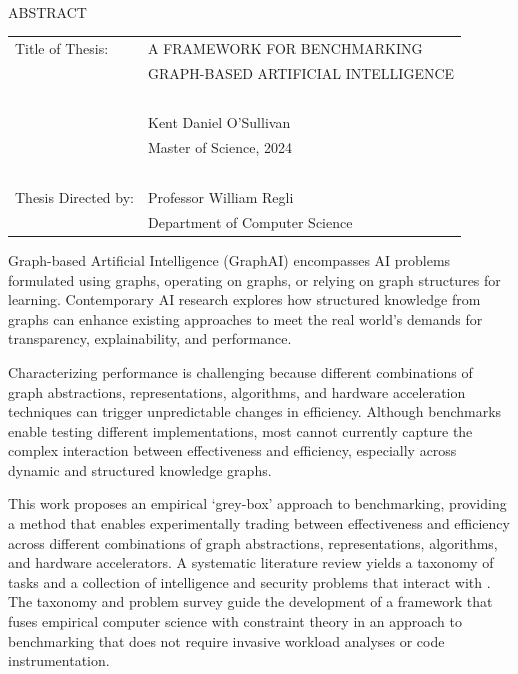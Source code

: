 
\hbox{\ } \vspace{.7in}
\renewcommand{\baselinestretch}{1}
\small \normalsize

\begin{center}
\large{{ABSTRACT}}

\vspace{3em}

\end{center}
\hspace{-.15in}
\begin{tabular}{ll}
Title of Thesis:    & {\large  A FRAMEWORK FOR BENCHMARKING }\\
&                     {\large  GRAPH-BASED ARTIFICIAL INTELLIGENCE} \\
\ \\
&                          {\large  Kent Daniel O'Sullivan} \\
&                           {\large Master of Science, 2024} \\
\ \\
Thesis Directed by: & {\large  Professor William Regli} \\
&               {\large  Department of Computer Science } \\
\end{tabular}

\vspace{3em}

\renewcommand{\baselinestretch}{2}
\large \normalsize

Graph-based Artificial Intelligence (GraphAI) encompasses AI problems formulated using graphs, operating on graphs, or relying on graph structures for learning. 
Contemporary \ac{AI} research explores how structured knowledge from graphs can enhance existing approaches to meet the real world's demands for transparency, explainability, and performance.

Characterizing \gai performance is challenging because different combinations of graph abstractions, representations, algorithms, and hardware acceleration techniques can trigger unpredictable changes in efficiency. 
Although benchmarks enable testing different \gai implementations, most cannot currently capture the complex interaction between effectiveness and efficiency, especially across dynamic and structured knowledge graphs.

This work proposes an empirical `grey-box' approach to \gai benchmarking, providing a method that enables experimentally trading between effectiveness and efficiency across different combinations of graph abstractions, representations, algorithms, and hardware accelerators. 
A systematic literature review yields a taxonomy of \gai tasks and a collection of intelligence and security problems that interact with \gai.
The taxonomy and problem survey guide the development of a framework that fuses empirical computer science with constraint theory in an approach to benchmarking that does not require invasive workload analyses or code instrumentation.

